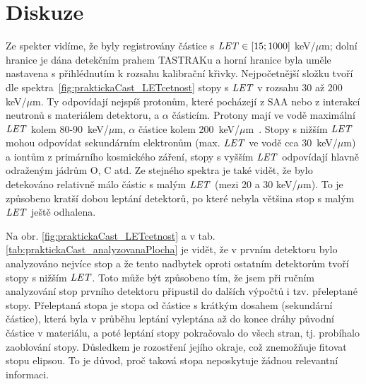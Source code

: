 \section{Diskuze}
Ze spekter vidíme, že byly registrovány částice s $\mathit{LET}\in[15;1000]$ keV/$\mu$m; dolní hranice je dána detekčním prahem TASTRAKu a horní hranice byla uměle nastavena s přihlédnutím k rozsahu kalibrační křivky. Nejpočetnější složku tvoří dle spektra~\ref{fig:praktickaCast_LETcetnost} stopy s $\mathit{LET}$ v rozsahu 30 až 200 keV/$\mu$m. Ty odpovídají nejspíš protonům, které pocházejí z SAA nebo z interakcí neutronů s materiálem detektoru, a $\alpha$ částicím. Protony mají ve vodě maximální $\mathit{LET}$ kolem 80-90~keV/$\mu$m, $\alpha$ částice kolem 200~keV/$\mu$m~\cite{SRIM}. Stopy s nižším $\mathit{LET}$ mohou odpovídat sekundárním elektronům (max. $\mathit{LET}$ ve vodě cca 30~keV/$\mu$m) a iontům z primárního kosmického záření, stopy s vyšším $\mathit{LET}$ odpovídají hlavně odraženým jádrům O, C atd. Ze stejného spektra je
také vidět, že bylo detekováno relativně málo částic s malým $\mathit{LET}$ (mezi 20 a 30 keV/$\mu$m). To je způsobeno kratší dobou leptání detektorů, po které nebyla většina stop s malým $\mathit{LET}$ ještě odhalena. 

Na obr. \ref{fig:praktickaCast_LETcetnost} a v tab. \ref{tab:praktickaCast_analyzovanaPlocha} je vidět, že v prvním detektoru bylo analyzováno nejvíce stop a že tento nadbytek oproti ostatním detektorům tvoří stopy s nižším $\mathit{LET}$. Toto může být způsobeno tím, že jsem při ručním analyzování stop prvního detektoru připustil do dalších výpočtů i tzv. přeleptané stopy. Přeleptaná stopa je stopa od částice s krátkým dosahem (sekundární částice), která byla v průběhu leptání vyleptána až do konce dráhy původní částice v materiálu, a poté leptání stopy pokračovalo do všech stran, tj. probíhalo zaoblování stopy. Důsledkem je rozostření jejího okraje, což znemožňuje fitovat stopu elipsou. To je důvod, proč taková stopa neposkytuje žádnou relevantní informaci.

